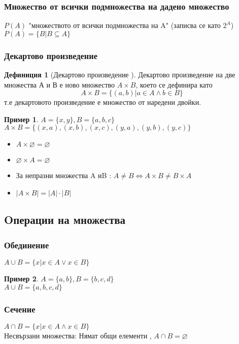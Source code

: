 \documentclass[fleqn, 12pt]{article}
\theoremstyle{definition}
\newtheorem{example}{Пример}[subsection]
\newtheorem{definition}{Дефиниция}[subsection]
\begin{document}
\subsubsection{Множество от всички подмножества на дадено множество}
$P(A)$ "множеството от всички подмножества на A" (записва се като $2^A$)\\
$P(A) = \{B | B\subseteq A \}$

\subsubsection{Декартово произведение}
\begin{definition}[Декартово произведение ]
Декартово произведение на две множества А и В е ново множество $A \times B$, което се дефинира като
$$A \times B = \{(a,b) | a\in A \land b \in B \}$$
т.е декартовото произведение е множество от наредени двойки. 
\end{definition}

\begin{example}
$A = \{x, y\}, B = \{a, b, c\}$\\
$A \times B = \{(x, a), (x, b), (x, c), (y, a), (y, b), (y, c)\}$
\end{example}
 
\begin{itemize}
	\item $A \times \varnothing = \varnothing$
	\item $\varnothing \times A = \varnothing$
	\item За непразни множества A иB : $A\neq B \Leftrightarrow A \times B \neq B \times A$
	\item $|A \times B| = |A|\cdot |B|$
\end{itemize}

\subsection {Oперации на множества} 
 
\subsubsection{Обединение}
$A \cup B = \{x | x\in A \lor x \in B\}$
\begin{example}
$A = \{a, b\}, B = \{b, c, d\}$\\
$A \cup B = \{a, b, c, d\}$
\end{example}

\subsubsection{Сечение}
$A \cap B = \{x | x\in A \land x \in B\}$\\
Несвързани множества: Нямат общи елементи , $A \cap B = \varnothing$
\end{document}
